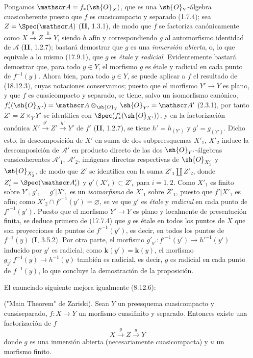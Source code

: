 Pongamos $\mathscr A=f_*(\sh{O}_X)$, que es una $\sh{O}_Y$-álgebra cuasicoherente puesto que $f$ es cuasicompacto y separado (1.7.4); sea $Z=\Spec(\mathscr A)$ (\textbf{II}, 1.3.1), de modo que $f$ se factoriza canónicamente como
$X\xrightarrow{g}Z\xrightarrow{h}Y$,
siendo $h$ afín y correspondiendo $g$ al automorfismo identidad de $\mathscr A$ (\textbf{II}, 1.2.7); bastará demostrar que $g$ es una \emph{inmersión abierta}, o, lo que equivale a lo mismo (17.9.1), que $g$ es \emph{étale} y \emph{radicial}. Evidentemente bastará demostrar que, para todo $y\in Y$, el morfismo $g$ es étale y radicial en cada punto de $f^{-1}(y)$. Ahora bien, para todo $y\in Y$, se puede aplicar a $f$ el resultado de (18.12.3), cuyas notaciones conservamos; puesto que el morfismo $Y'\to Y$ es plano, y que $f$ es cuasicompacto y separado, se tiene, salvo un isomorfismo canónico,
$f'_*(\sh{O}_{X'})=\mathscr A\otimes_{\sh{O}_Y}\sh{O}_{Y'}=\mathscr A'$
(2.3.1), por tanto $Z'=Z\times_Y Y'$ se identifica con $\Spec(f'_*(\sh{O}_{X'}))$, y en la factorización canónica
$X'\xrightarrow{g'}Z'\xrightarrow{h'}Y'$
de $f'$ (\textbf{II}, 1.2.7), se tiene $h'=h_{(Y')}$ y $g'=g_{(Y')}$. Dicho esto, la descomposición de $X'$ en suma de dos subpreesquemas $X'_1$, $X'_2$ induce la descomposición de $\mathscr A'$ en producto directo de las dos $\sh{O}_{Y'}$-álgebras cuasicoherentes $\mathscr A'_1$, $\mathscr A'_2$, imágenes directas respectivas de $\sh{O}_{X'_1}$ y $\sh{O}_{X'_2}$, de modo que $Z'$ se identifica con la suma $Z'_1\amalg Z'_2$, donde $Z'_i=\Spec(\mathscr A'_i)$ y $g'(X'_i)\subset Z'_i$ para $i=1,2$. Como $X'_1$ es finito sobre $Y'$, $g'_1=g'|X'_1$ es un \emph{isomorfismo} de $X'_1$ sobre $Z'_1$, puesto que $f'|X'_1$ es afín; como $X'_2\cap f'^{-1}(y')=\varnothing$, se ve que $g'$ es \emph{étale} y \emph{radicial} en cada punto de $f'^{-1}(y')$. Puesto que el morfismo $Y'\to Y$ es plano y localmente de presentación finita, se deduce primero de (17.7.4) que $g$ es étale en todos los puntos de $X$ que son proyecciones de puntos de $f'^{-1}(y')$, es decir, en todos los puntos de $f^{-1}(y)$ (\textbf I, 3.5.2). Por otra parte, el morfismo
$g'_{y'}:f'^{-1}(y')\longrightarrow h'^{-1}(y')$
inducido por $g'$ es radicial; como $\boldsymbol{k}(y')=\boldsymbol{k}(y)$, el morfismo $g_y:f^{-1}(y)\to h^{-1}(y)$ también es radicial, es decir, $g$ es radicial en cada punto de $f^{-1}(y)$, lo que concluye la demostración de la proposición.

El enunciado siguiente mejora igualmente (8.12.6):

\begin{corollary}[18.12.13]
\label{IV.18.12.13}
("Main Theorem" de Zariski). Sean $Y$ un preesquema cuasicompacto y cuasiseparado, $f:X\to Y$ un morfismo cuasifinito y separado. Entonces existe una factorización de $f$
\[
  X\xrightarrow{g}Z\xrightarrow{u}Y
\]
donde $g$ es una inmersión abierta (necesariamente cuasicompacta) y $u$ un morfismo finito.
\end{corollary}

